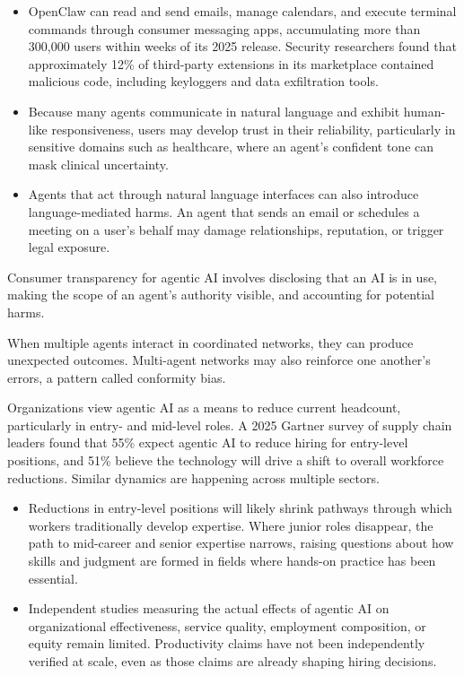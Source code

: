 \documentclass[acmlarge,nonacm,natbib=false]{acmart}
\begin{document}
\begin{techbriefbody}
\begin{itemize}
\item OpenClaw can read and send emails, manage calendars, and execute
  terminal commands through consumer messaging apps, accumulating more
  than 300,000 users within weeks of its 2025
  release.\cite{zaitsev2026openclaw} Security researchers found that
  approximately 12\% of third-party extensions in its marketplace
  contained malicious code, including keyloggers and data exfiltration
  tools.\cite{chang2026openclaw}
\item Because many agents communicate in natural language and exhibit
  human-like responsiveness, users may develop trust in their
  reliability, particularly in sensitive domains such as healthcare,
  where an agent's confident tone can mask clinical
  uncertainty.\cite{bellogin2025systemic}
\item Agents that act through natural language interfaces can also
  introduce language-mediated harms. An agent that sends an email or
  schedules a meeting on a user's behalf may damage relationships,
  reputation, or trigger legal exposure.
\end{itemize}

\begin{takeaway}
Consumer transparency for agentic AI involves disclosing that an AI is in
use, making the scope of an agent's authority visible, and accounting for
potential harms.
\end{takeaway}

 When multiple agents interact
in coordinated networks, they can produce unexpected outcomes.
Multi-agent networks may also reinforce one another's errors, a pattern
called conformity bias.\cite{schroederdewitt2025multiagent,ashery2025emergent}

 Organizations view agentic AI
as a means to reduce current headcount, particularly in entry- and
mid-level roles. A 2025 Gartner survey of supply chain leaders found that
55\% expect agentic AI to reduce hiring for entry-level positions, and
51\% believe the technology will drive a shift to overall workforce
reductions.\cite{gartner2026survey} Similar dynamics are happening across
multiple sectors.

\begin{itemize}
\item Reductions in entry-level positions will likely shrink pathways
  through which workers traditionally develop expertise. Where junior
  roles disappear, the path to mid-career and senior expertise narrows,
  raising questions about how skills and judgment are formed in fields
  where hands-on practice has been essential.
\item Independent studies measuring the actual effects of agentic AI on
  organizational effectiveness, service quality, employment composition,
  or equity remain limited. Productivity claims have not been
  independently verified at scale, even as those claims are already
  shaping hiring decisions.
\end{itemize}


\end{techbriefbody}
\end{document}
